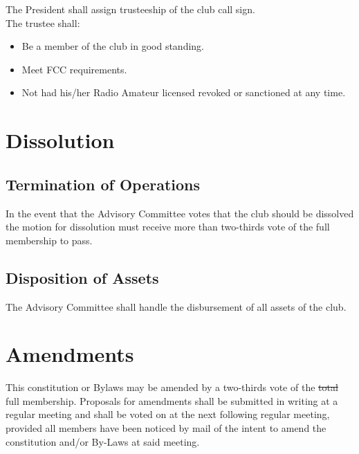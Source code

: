 \documentclass{article}
\begin{document}
\noindent The President shall assign trusteeship of the club call sign.\\

\noindent The trustee shall:
\begin{itemize}
\item Be a member of the club in good standing.

\item Meet FCC requirements.

\item Not had his/her Radio Amateur licensed revoked or sanctioned at any time.
\end{itemize}

\section{Dissolution}
\subsection{Termination of Operations}

In the event that the Advisory Committee votes that the club should be dissolved the motion for dissolution must receive more than two-thirds vote of the full membership to pass.

\subsection{Disposition of Assets}

The Advisory Committee shall handle the disbursement of all assets of the club.

\section{Amendments}
This constitution or Bylaws may be amended by a two-thirds vote of the {\color{red} \sout{total} full} membership. Proposals for amendments shall be submitted in writing at a regular meeting and shall be voted on at the next following regular meeting, provided all members have been noticed by mail of the intent to amend the constitution and/or By-Laws at said meeting.
\end{document}
